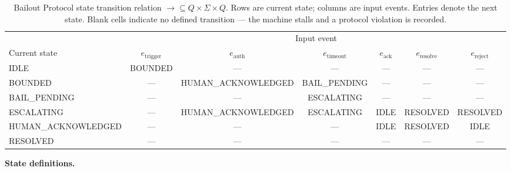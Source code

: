 \begin{table}[htbp]
\caption{Bailout Protocol state transition relation $\rightarrow \subseteq Q \times \Sigma \times Q$. Rows are current state; columns are input events. Entries denote the next state. Blank cells indicate no defined transition — the machine stalls and a protocol violation is recorded.}
\label{tab:bailout-transitions}
\begin{tabular}{@{}lcccccc@{}}
\toprule
 & \multicolumn{6}{c}{Input event} \\
\cmidrule(l){2-7}
Current state & $e_{\text{trigger}}$ & $e_{\text{auth}}$ & $e_{\text{timeout}}$ & $e_{\text{ack}}$ & $e_{\text{resolve}}$ & $e_{\text{reject}}$ \\
\midrule
IDLE              & BOUNDED            & — & — & — & — & — \\
BOUNDED           & — & HUMAN\_ACKNOWLEDGED & BAIL\_PENDING & — & — & — \\
BAIL\_PENDING     & — & — & ESCALATING & — & — & — \\
ESCALATING        & — & HUMAN\_ACKNOWLEDGED & ESCALATING & IDLE & RESOLVED & RESOLVED \\
HUMAN\_ACKNOWLEDGED & — & — & — & IDLE & RESOLVED & IDLE \\
RESOLVED          & — & — & — & — & — & — \\
\bottomrule
\end{tabular}
\end{table}

\bigskip
\noindent\textbf{State definitions.}

